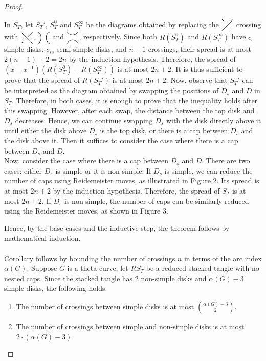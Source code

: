 \documentclass{article}
\newcommand{\czero}{
  \tikz[baseline=-0.6ex, scale=0.7]{
    \path (0,0) coordinate (base);
    \draw[line width=0.7pt] (0,0.4) .. controls (0.3,0.3) and (0.3,-0.3) .. (0,-0.4);
    \draw[line width=0.7pt] (0.8,0.4) .. controls (0.5,0.3) and (0.5,-0.3) .. (0.8,-0.4);
  }
}
\newcommand{\cinf}{
  \tikz[baseline=1.2ex, scale=0.7]{
    \path (0,0) coordinate (base);
    \draw[line width=0.7pt] (0.4, 0) .. controls (0.2, 0.3) and (-0.2, 0.3) .. (-0.4, 0);
    \draw[line width=0.7pt] (0.4, 0.8) .. controls (0.2, 0.5) and (-0.2, 0.5) .. (-0.4, 0.8);
  }
}
\newcommand{\Xslashfront}{
  \tikz[baseline=-0.6ex, scale=0.28]{
    \draw[line width=0.7pt] (-1,1) -- (1,-1);
    \draw[line width=4.0pt, white] (-0.5,-0.5) -- (0.5, 0.5);
    \draw[line width=0.7pt] (-1,-1) -- (1,1);
  }
}
\newcommand{\Xslashback}{
  \tikz[baseline=-0.6ex, scale=0.28]{
    \draw[line width=0.7pt] (-1,-1) -- (1,1);
    \draw[line width=4.0pt, white] (-0.5,0.5) -- (0.5,-0.5);
    \draw[line width=0.7pt] (-1,1) -- (1,-1);
  }
}
\theoremstyle{definition}
\theoremstyle{theorem}
\theoremstyle{proposition}
\theoremstyle{corollary}
\begin{document}
\begin{proof}
\begin{enumerate}
        In $S_T$, let $S_T'$, $S_T^0$ and $S_T^\infty$ be the diagrams obtained by replacing the $\Xslashfront$ crossing with $\Xslashback$, $\czero$ and $\cinf$, respectively. Since both $R \left( S_T^0 \right)$ and $R \left( S_T^\infty \right)$ have $c_s$ simple disks, $c_{ss}$ semi-simple disks, and $n-1$ crossings, their spread is at most $2(n-1)+2=2n$ by the induction hypothesis. Therefore, the spread of $(x - x^{-1}) \left( R \left( S_T^0 \right) - R \left( S_T^\infty \right) \right)$ is at most $2n+2$. It is thus sufficient to prove that the spread of $R \left( S_T' \right)$ is at most $2n+2$. Now, observe that $S_T'$ can be interpreted as the diagram obtained by swapping the positions of $D_s$ and $D$ in $S_T$. Therefore, in both cases, it is enough to prove that the inequality holds after this swapping. However, after each swap, the distance between the top disk and $D_s$ decreases. Hence, we can continue swapping $D_s$ with the disk directly above it until either the disk above $D_s$ is the top disk, or there is a cap between $D_s$ and the disk above it. Then it suffices to consider the case where there is a cap between $D_s$ and $D$. \\
        Now, consider the case where there is a cap between $D_s$ and $D$. There are two cases: either $D_s$ is simple or it is non-simple. If $D_s$ is simple, we can reduce the number of caps using Reidemeister moves, as illustrated in Figure 2. Its spread is at most $2n+2$ by the induction hypothesis. Therefore, the spread of $S_T$ is at most $2n+2$. If $D_s$ is non-simple, the number of caps can be similarly reduced using the Reidemeister moves, as shown in Figure 3. \\
    \end{enumerate}
    Hence, by the base cases and the inductive step, the theorem follows by mathematical induction. \\ \\
    Corollary follows by bounding the number of crossings $n$ in terms of the arc index $\alpha(G)$. Suppose $G$ is a theta curve, let $RS_T$ be a reduced stacked tangle with no nested caps. Since the stacked tangle has $2$ non-simple disks and $\alpha(G)-3$ simple disks, the following holds.
    \begin{enumerate}
        \item The number of crossings between simple disks is at most $\binom{\alpha(G)-3}{2}$.
        \item The number of crossings between simple and non-simple disks is at most $2 \cdot (\alpha(G)-3)$.

\end{enumerate}
\end{proof}
\end{document}
